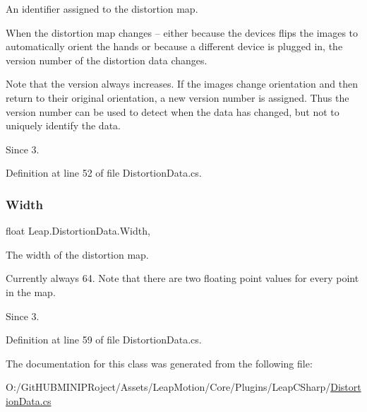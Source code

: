 An identifier assigned to the distortion map. 

When the distortion map changes -- either because the devices flips the images to automatically orient the hands or because a different device is plugged in, the version number of the distortion data changes.

Note that the version always increases. If the images change orientation and then return to their original orientation, a new version number is assigned. Thus the version number can be used to detect when the data has changed, but not to uniquely identify the data. \begin{DoxySince}{Since}
3. 
\end{DoxySince}


Definition at line 52 of file Distortion\+Data.\+cs.

\mbox{\label{class_leap_1_1_distortion_data_a13e52f4d69488b1781dccfc3ace4ddb5}} 
\subsubsection{\texorpdfstring{Width}{Width}}
{\footnotesize\ttfamily float Leap.\+Distortion\+Data.\+Width\hspace{0.3cm}{\ttfamily [get]}, {\ttfamily [set]}}



The width of the distortion map. 

Currently always 64. Note that there are two floating point values for every point in the map. \begin{DoxySince}{Since}
3. 
\end{DoxySince}


Definition at line 59 of file Distortion\+Data.\+cs.



The documentation for this class was generated from the following file\+:\begin{DoxyCompactItemize}
\item 
O\+:/\+Git\+H\+U\+B\+M\+I\+N\+I\+P\+Roject/\+Assets/\+Leap\+Motion/\+Core/\+Plugins/\+Leap\+C\+Sharp/\mbox{\hyperlink{_distortion_data_8cs}{Distortion\+Data.\+cs}}\end{DoxyCompactItemize}
